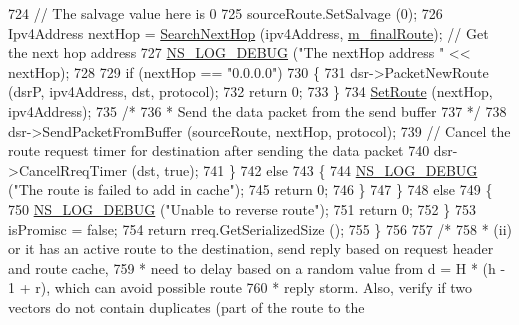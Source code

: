 \begin{DoxyCode}
724                   \textcolor{comment}{// The salvage value here is 0}
725                   sourceRoute.SetSalvage (0);
726                   Ipv4Address nextHop = \hyperlink{classns3_1_1dsr_1_1DsrOptions_a061c66ba810a71ae227371a45cc30cc0}{SearchNextHop} (ipv4Address, 
      \hyperlink{classns3_1_1dsr_1_1DsrOptions_a3fe6a72ebaae73724ce63383635b7af8}{m\_finalRoute}); \textcolor{comment}{// Get the next hop address}
727                   \hyperlink{group__logging_ga413f1886406d49f59a6a0a89b77b4d0a}{NS\_LOG\_DEBUG} (\textcolor{stringliteral}{"The nextHop address "} << nextHop);
728 
729                   \textcolor{keywordflow}{if} (nextHop == \textcolor{stringliteral}{"0.0.0.0"})
730                     \{
731                       dsr->PacketNewRoute (dsrP, ipv4Address, dst, protocol);
732                       \textcolor{keywordflow}{return} 0;
733                     \}
734                   \hyperlink{classns3_1_1dsr_1_1DsrOptions_af749b76db4626ae64bc37001a5353b99}{SetRoute} (nextHop, ipv4Address);
735                   \textcolor{comment}{/*}
736 \textcolor{comment}{                   * Send the data packet from the send buffer}
737 \textcolor{comment}{                   */}
738                   dsr->SendPacketFromBuffer (sourceRoute, nextHop, protocol);
739                   \textcolor{comment}{// Cancel the route request timer for destination after sending the data packet}
740                   dsr->CancelRreqTimer (dst, \textcolor{keyword}{true});
741                 \}
742               \textcolor{keywordflow}{else}
743                 \{
744                   \hyperlink{group__logging_ga413f1886406d49f59a6a0a89b77b4d0a}{NS\_LOG\_DEBUG} (\textcolor{stringliteral}{"The route is failed to add in cache"});
745                   \textcolor{keywordflow}{return} 0;
746                 \}
747             \}
748           \textcolor{keywordflow}{else}
749             \{
750               \hyperlink{group__logging_ga413f1886406d49f59a6a0a89b77b4d0a}{NS\_LOG\_DEBUG} (\textcolor{stringliteral}{"Unable to reverse route"});
751               \textcolor{keywordflow}{return} 0;
752             \}
753           isPromisc = \textcolor{keyword}{false};
754           \textcolor{keywordflow}{return} rreq.GetSerializedSize ();
755         \}
756 
757       \textcolor{comment}{/*}
758 \textcolor{comment}{       * (ii) or it has an active route to the destination, send reply based on request header and route
       cache,}
759 \textcolor{comment}{       *      need to delay based on a random value from d = H * (h - 1 + r), which can avoid possible
       route}
760 \textcolor{comment}{       *      reply storm. Also, verify if two vectors do not contain duplicates (part of the route to the}

\end{DoxyCode}
